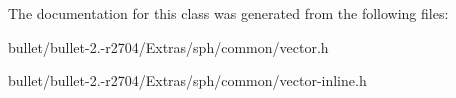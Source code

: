 The documentation for this class was generated from the following files\+:\begin{DoxyCompactItemize}
\item 
bullet/bullet-\/2.-\/r2704/\+Extras/sph/common/vector.\+h\item 
bullet/bullet-\/2.-\/r2704/\+Extras/sph/common/vector-\/inline.\+h\end{DoxyCompactItemize}
